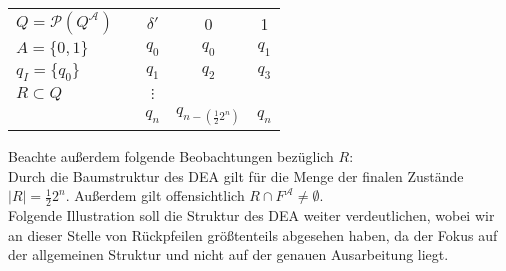\documentclass[12pt, a4paper]{article}
\newcommand*{\puffer}{\text{ }\text{ }\text{ }\text{ }}
\begin{document}
\begin{center}
    \begin{tabular}{l c c | c c}
    
    \( Q = \mathcal{P}(Q^{\mathcal{A}})\) & \puffer \puffer  & \(\delta '\) & 0       & 1 \\\cmidrule{3-5}
    \(A = \{0,1\}\)                                         && \(q_0\)      & \(q_0\) & \(q_1\) \\
    \(q_I = \{q_0\}\)                                       && \(q_1\)      & \(q_2\) & \(q_3\) \\
    \(R \subset Q\)\puffer                                  && \(\vdots\)   &         & \\
                                                            && \(q_n\)      & \(q_{n-(\frac{1}{2}2^n)}\) & \(q_n\) \\
    \end{tabular}
\end{center}
Beachte außerdem folgende Beobachtungen bezüglich \(R\):\\
Durch die Baumstruktur des DEA gilt für die Menge der finalen Zustände 
\(\vert R \vert = \frac{1}{2}2^n\). Außerdem gilt offensichtlich 
\(R \cap F^{\mathcal{A}} \neq \emptyset\). \\
Folgende Illustration soll die Struktur des DEA weiter verdeutlichen, wobei wir an 
dieser Stelle von Rückpfeilen größtenteils abgesehen haben, da der Fokus auf der 
allgemeinen Struktur und nicht auf der genauen Ausarbeitung liegt.
\end{document}
